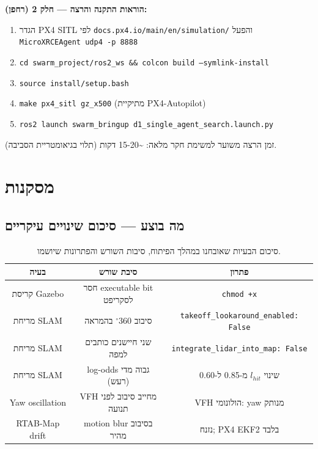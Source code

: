 \documentclass[11pt,a4paper]{article}
\begin{document}
\textbf{הוראות התקנה והרצה — חלק 2 (רחפן):}
\begin{enumerate}
    \item הגדר \textenglish{PX4 SITL} לפי \texttt{\textenglish{docs.px4.io/main/en/simulation/}} והפעל \texttt{\textenglish{MicroXRCEAgent udp4 -p 8888}}
    \item \texttt{\textenglish{cd swarm\_project/ros2\_ws \&\& colcon build --symlink-install}}
    \item \texttt{\textenglish{source install/setup.bash}}
    \item \texttt{\textenglish{make px4\_sitl gz\_x500}} (מתיקיית \textenglish{PX4-Autopilot})
    \item \texttt{\textenglish{ros2 launch swarm\_bringup d1\_single\_agent\_search.launch.py}}
\end{enumerate}

זמן הרצה משוער למשימת חקר מלאה: \textasciitilde{}15-20 דקות (תלוי בגיאומטריית הסביבה).

\section{מסקנות}

\subsection{מה בוצע — סיכום שינויים עיקריים}

\begin{table}[H]
\centering
\small
\begin{tabular}{ccc}
\toprule
\textbf{בעיה} & \textbf{סיבת שורש} & \textbf{פתרון} \\
\midrule
קריסת \textenglish{Gazebo} & חסר \textenglish{executable bit} לסקריפט & \texttt{chmod +x} \\
מריחת \textenglish{SLAM} & סיבוב 360$^{\circ}$ בהמראה & \texttt{takeoff\_lookaround\_enabled: False} \\
מריחת \textenglish{SLAM} & שני חיישנים כותבים למפה & \texttt{integrate\_lidar\_into\_map: False} \\
מריחת \textenglish{SLAM} & \textenglish{log-odds} גבוה מדי (רעש) & שינוי $l_{hit}$ מ-0.85 ל-0.60 \\
\textenglish{Yaw} oscillation & \textenglish{VFH} מחייב סיבוב לפני תנועה & \textenglish{VFH} הולונומי: \textenglish{yaw} מנותק \\
\textenglish{RTAB-Map} drift & \textenglish{motion blur} בסיבוב מהיר & נזנח; \textenglish{PX4 EKF2} בלבד \\
\bottomrule
\end{tabular}
\caption{סיכום הבעיות שאובחנו במהלך הפיתוח, סיבות השורש והפתרונות שיושמו.}
\label{tab:problems_solutions}
\end{table}
\end{document}

